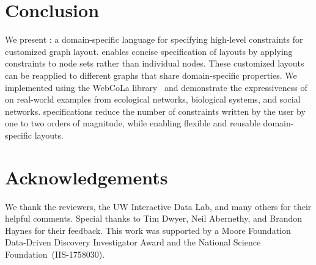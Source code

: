\vspace{-7px}
\section{Conclusion}
We present \projectname: a domain-specific language for specifying high-level
constraints for customized graph layout. \projectname enables concise 
specification of layouts by applying constraints to node sets
rather than individual nodes. These customized layouts can
be reapplied to different graphs that share domain-specific properties.
We implemented \projectname using the WebCoLa library~\cite{WebCoLa} and demonstrate the expressiveness
of \projectname on real-world examples from ecological networks,
biological systems, and social networks. \projectname specifications reduce the
number of constraints written by the user by one to two orders of magnitude,
while enabling flexible and reusable domain-specific layouts.

\section*{Acknowledgements}
We thank the reviewers, the UW Interactive Data Lab, and
many others for their helpful comments. Special thanks to Tim Dwyer,
Neil Abernethy, and Brandon Haynes for their feedback. This work was supported
by a Moore Foundation Data-Driven Discovery Investigator Award
and the National Science \mbox{Foundation (IIS-1758030)}.